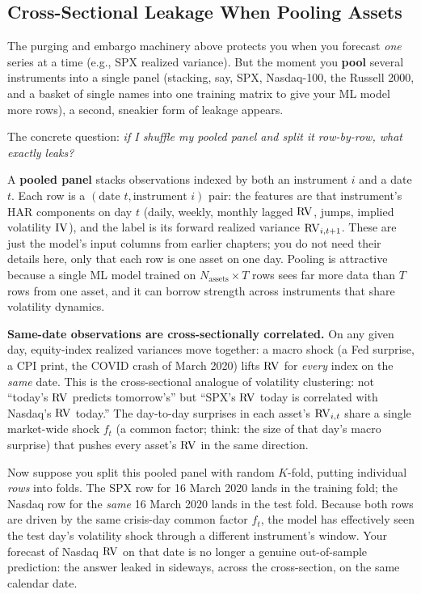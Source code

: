 \subsection{Cross-Sectional Leakage When Pooling Assets}
\label{sec:ch16:xsection-leakage}

The purging and embargo machinery above protects you when you forecast \emph{one} series at a time (e.g., SPX realized variance).
But the moment you \textbf{pool} several instruments into a single panel (stacking, say, SPX, Nasdaq-100, the Russell 2000, and a basket of single names into one training matrix to give your ML model more rows), a second, sneakier form of leakage appears.

The concrete question: \emph{if I shuffle my pooled panel and split it row-by-row, what exactly leaks?}

\begin{prereq}
A \textbf{pooled panel} stacks observations indexed by both an instrument $i$ and a date $t$.
Each row is a $(\text{date } t, \text{instrument } i)$ pair: the features are that instrument's HAR components on day $t$ (daily, weekly, monthly lagged $\operatorname{RV}$, jumps, implied volatility $\operatorname{IV}$), and the label is its forward realized variance $\operatorname{RV}_{i,t+1}$.
These are just the model's input columns from earlier chapters; you do not need their details here, only that each row is one asset on one day.
Pooling is attractive because a single ML model trained on $N_{\text{assets}} \times T$ rows sees far more data than $T$ rows from one asset, and it can borrow strength across instruments that share volatility dynamics.
\end{prereq}

\textbf{Same-date observations are cross-sectionally correlated.}
On any given day, equity-index realized variances move together: a macro shock (a Fed surprise, a CPI print, the COVID crash of March 2020) lifts $\operatorname{RV}$ for \emph{every} index on the \emph{same} date.
This is the cross-sectional analogue of volatility clustering: not ``today's $\operatorname{RV}$ predicts tomorrow's'' but ``SPX's $\operatorname{RV}$ today is correlated with Nasdaq's $\operatorname{RV}$ today.''
The day-to-day surprises in each asset's $\operatorname{RV}_{i,t}$ share a single market-wide shock $f_t$ (a common factor; think: the size of that day's macro surprise) that pushes every asset's $\operatorname{RV}$ in the same direction.

Now suppose you split this pooled panel with random $K$-fold, putting individual \emph{rows} into folds. The SPX row for 16 March 2020 lands in the training fold; the Nasdaq row for the \emph{same} 16 March 2020 lands in the test fold. Because both rows are driven by the same crisis-day common factor $f_t$, the model has effectively seen the test day's volatility shock through a different instrument's window. Your forecast of Nasdaq $\operatorname{RV}$ on that date is no longer a genuine out-of-sample prediction: the answer leaked in sideways, across the cross-section, on the same calendar date.

